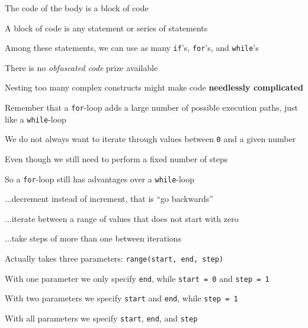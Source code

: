 \documentclass{beamer}
\begin{document}
\begin{slide}{
\item The code of the body is a block of code
\item A block of code is any statement or series of statements
\item Among these statements, we can use as many \texttt{if}'s, \texttt{for}'s, and \texttt{while}'s
}\end{slide}

\begin{slide}{
\item There is no \textit{obfuscated code} prize available
\item Nesting too many complex constructs might make code \textbf{needlessly complicated}
\item Remember that a \texttt{for}-loop adds a large number of possible execution paths, just like a \texttt{while}-loop
}\end{slide}

\begin{slide}{
\item We do not always want to iterate through values between \texttt{0} and a given number
\item Even though we still need to perform a fixed number of steps
\item So a \texttt{for}-loop still has advantages over a \texttt{while}-loop
}\end{slide}

\begin{slide}{
\item ...decrement instead of increment, that is ``go backwards''
\item ...iterate between a range of values that does not start with zero
\item ...take steps of more than one between iterations
}\end{slide}

\begin{slide}{
\item Actually takes three parameters: \texttt{range(start, end, step)}
\item With one parameter we only specify \texttt{end}, while \texttt{start = 0} and \texttt{step = 1}
\item With two parameters we specify \texttt{start} and \texttt{end}, while \texttt{step = 1}
\item With all parameters we specify \texttt{start}, \texttt{end}, and \texttt{step}
}\end{slide}
\end{document}
